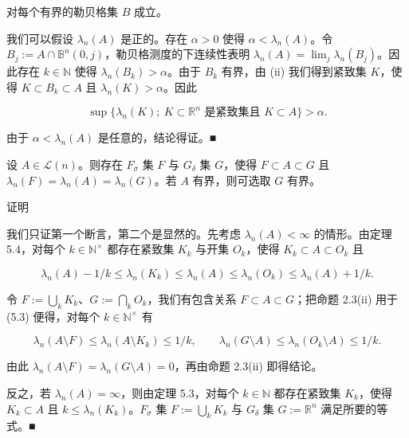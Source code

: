 \begin{theorem}
\begin{subitems}
对每个有界的勒贝格集 $ B $ 成立。

\item

我们可以假设 $ \lambda_n(A) $ 是正的。存在 $ \alpha > 0 $ 使得 $ \alpha < \lambda_n(A) $。令 $ B_j := A \cap \mathbb{B}^n(0, j) $，勒贝格测度的下连续性表明 $ \lambda_n(A) = \lim_j \lambda_n(B_j) $。因此存在 $ k \in \mathbb{N} $ 使得 $ \lambda_n(B_k) > \alpha $。由于 $ B_k $ 有界，由 (ii) 我们得到紧致集 $ K $，使得 $ K \subset B_k \subset A $ 且 $ \lambda_n(K) > \alpha $。因此

\[
\sup \{ \lambda_n(K) ; \ K \subset \mathbb{R}^n \text{ 是紧致集且 } K \subset A \} > \alpha .
\]

由于 $ \alpha < \lambda_n(A) $ 是任意的，结论得证。\nobreak\hspace{0.35em}■

\end{subitems}

\end{theorem}

\begin{corollary}

设 $ A \in \mathcal{L}(n) $。则存在 $ F_\sigma $ 集 $ F $ 与 $ G_\delta $ 集 $ G $，使得 $ F \subset A \subset G $ 且 $ \lambda_n(F) = \lambda_n(A) = \lambda_n(G) $。若 $ A $ 有界，则可选取 $ G $ 有界。

证明

\begin{subitems}
\item

我们只证第一个断言，第二个是显然的。先考虑 $ \lambda_n(A) < \infty $ 的情形。由定理 5.4，对每个 $ k \in \mathbb{N}^{\times} $ 都存在紧致集 $ K_k $ 与开集 $ O_k $，使得 $ K_k \subset A \subset O_k $ 且

\begin{equation}
\lambda_n(A) - 1/k \le \lambda_n(K_k) \le \lambda_n(A) \le \lambda_n(O_k) \le \lambda_n(A) + 1/k .\tag{5.3}
\end{equation}

令 $ F := \bigcup_k K_k $、$ G := \bigcap_k O_k $，我们有包含关系 $ F \subset A \subset G $；把命题 2.3(ii) 用于 (5.3) 便得，对每个 $ k \in \mathbb{N}^{\times} $ 有

\[
\lambda_n(A \setminus F) \le \lambda_n(A \setminus K_k) \le 1/k , \qquad \lambda_n(G \setminus A) \le \lambda_n(O_k \setminus A) \le 1/k .
\]

由此 $ \lambda_n(A \setminus F) = \lambda_n(G \setminus A) = 0 $，再由命题 2.3(ii) 即得结论。

\item

反之，若 $ \lambda_n(A) = \infty $，则由定理 5.3，对每个 $ k \in \mathbb{N} $ 都存在紧致集 $ K_k $，使得 $ K_k \subset A $ 且 $ k \le \lambda_n(K_k) $。$ F_\sigma $ 集 $ F := \bigcup_k K_k $ 与 $ G_\delta $ 集 $ G := \mathbb{R}^n $ 满足所要的等式。\nobreak\hspace{0.35em}■

\end{subitems}

\end{corollary}

